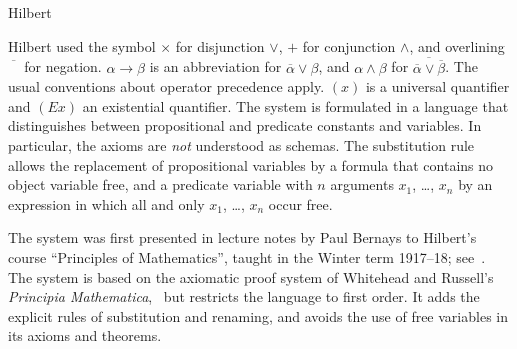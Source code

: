 \begin{entry}{Hilbert}
\begin{clarifications}
  Hilbert used the symbol $\times$ for disjunction $\lor$, $+$ for
  conjunction $\land$, and overlining $\overline{\phantom{X}}$ for
  negation. $\alpha \rightarrow \beta$ is an abbreviation for
  $\overline{\alpha} \lor \beta$, and $\alpha \land \beta$ for
  $\overline{\overline{\alpha} \lor \overline{\beta}}$. The usual
  conventions about operator precedence apply. $(x)$ is a universal
  quantifier and $(Ex)$ an existential quantifier. The system is
  formulated in a language that distinguishes between propositional and
  predicate constants and variables. In particular, the axioms
  are \emph{not} understood as schemas. The substitution rule allows the
  replacement of propositional variables by a formula that contains no
  object variable free, and a predicate variable with $n$ arguments
  $x_1$, \dots, $x_n$ by an expression in which all and only 
  $x_1$, \dots, $x_n$ occur free.
\end{clarifications}

\begin{history}
  The system was first presented in lecture notes by Paul Bernays to Hilbert's
  course ``Principles of Mathematics'', taught in the Winter term 1917--18;
  see~\cite{Hilbert1917}.
  The system is based on the axiomatic proof system of Whitehead and Russell's
  \emph{Principia Mathematica},~ but restricts
  the language to first order. It adds the explicit rules of substitution and
  renaming, and avoids the use of free variables in its axioms and theorems.
\end{history}


\end{entry}
